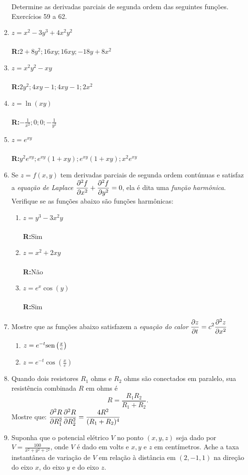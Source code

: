 \documentclass[oneside,a4paper,12pt]{article}
\newcommand{\sen}{{\rm sen}}
\newcommand{\R}{\\{\bf R:}}
\begin{document}
\begin{enumerate}
Determine as derivadas parciais de segunda ordem das seguintes funções. Exercícios 59 a 62.
            \item $z = x^2-3y^3+4x^2y^2$\\\R $2+8y^2;16xy;16xy;-18y+8x^2$
            \item $z = x^2y^2-xy$\\\R $2y^2;4xy-1;4xy-1;2x^2$
            \item $z = \ln(xy)$\\\R $-\displaystyle \frac{1}{x^2};0;0;-\frac{1}{y^2}$
            \item $z=e^{xy}$\\\R $y^2e^{xy};e^{xy}(1+xy);e^{xy}(1+xy);x^2e^{xy}$
    \item Se $z=f(x,y)$ tem derivadas parciais de segunda ordem contúnuas e satisfaz a \emph{equação de Laplace} $\displaystyle \pdv[2]{f}{x} + \pdv[2]{f}{y} = 0$, ela é dita uma \emph{função harmônica}. Verifique se as funções abaixo são funções harmônicas:
        \begin{enumerate}
            \item $z=y^3-3x^2y$\\\R Sim
            \item $z=x^2+2xy$\\\R Não
            \item $z=e^x\cos(y)$\\\R Sim
        \end{enumerate}
    \item Mostre que as funções abaixo satisfazem a \emph{equação do calor} $\displaystyle \pdv{z}{t} = c^2 \displaystyle \pdv[2]{z}{x}$
        \begin{enumerate}
            \item $z = e^{-t}\sen\left(\frac{x}{c}\right)$
            \item $z = e^{-t}\cos\left(\frac{x}{c}\right)$
        \end{enumerate}
    \item Quando dois resistores $R_1$ ohms e $R_2$ ohms são conectados em paralelo, sua resistência combinada $R$ em ohms é $$R = \frac{R_1R_2}{R_1 + R_2}.$$ Mostre que: $\displaystyle \pdv[2]{R}{R_1}\displaystyle \pdv[2]{R}{R_2} = \frac{4R^2}{(R_1+R_2)^4}$
    \item Suponha que o potencial elétrico $V$ no ponto $(x,y,z)$ seja dado por $V = \displaystyle \frac{100}{x^2+y^2+z^2}$, onde $V$ é dado em volts e $x,y$ e $z$ em centímetros. Ache a taxa instantânea de variação de $V$ em relação à distância em $(2,-1,1)$ na direção do eixo $x$, do eixo $y$ e do eixo $z$.

\end{enumerate}
\end{document}
